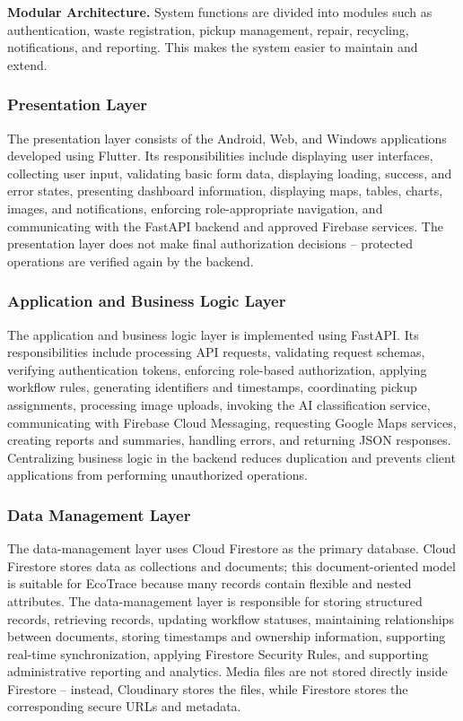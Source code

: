 \textbf{Modular Architecture.} System functions are divided into modules
such as authentication, waste registration, pickup management, repair,
recycling, notifications, and reporting. This makes the system easier to
maintain and extend.

\subsubsection{Presentation Layer}

The presentation layer consists of the Android, Web, and Windows
applications developed using Flutter. Its responsibilities include displaying
user interfaces, collecting user input, validating basic form data, displaying
loading, success, and error states, presenting dashboard information,
displaying maps, tables, charts, images, and notifications, enforcing
role-appropriate navigation, and communicating with the FastAPI backend and
approved Firebase services. The presentation layer does not make final
authorization decisions -- protected operations are verified again by the
backend.

\subsubsection{Application and Business Logic Layer}

The application and business logic layer is implemented using FastAPI. Its
responsibilities include processing API requests, validating request schemas,
verifying authentication tokens, enforcing role-based authorization, applying
workflow rules, generating identifiers and timestamps, coordinating pickup
assignments, processing image uploads, invoking the AI classification service,
communicating with Firebase Cloud Messaging, requesting Google Maps
services, creating reports and summaries, handling errors, and returning JSON
responses. Centralizing business logic in the backend reduces duplication and
prevents client applications from performing unauthorized operations.

\subsubsection{Data Management Layer}

The data-management layer uses Cloud Firestore as the primary database.
Cloud Firestore stores data as collections and documents; this document-oriented
model is suitable for EcoTrace because many records contain flexible
and nested attributes. The data-management layer is responsible for storing
structured records, retrieving records, updating workflow statuses, maintaining
relationships between documents, storing timestamps and ownership
information, supporting real-time synchronization, applying Firestore
Security Rules, and supporting administrative reporting and analytics. Media
files are not stored directly inside Firestore -- instead, Cloudinary stores the
files, while Firestore stores the corresponding secure URLs and metadata.

